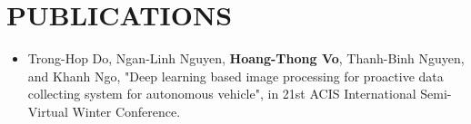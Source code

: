 \section{PUBLICATIONS}
\vspace{1mm}
\begin{itemize}[leftmargin=*]
    \item Trong-Hop Do, Ngan-Linh Nguyen, \textbf{Hoang-Thong Vo}, Thanh-Binh Nguyen, and Khanh Ngo, "Deep learning based image processing for proactive data collecting system for autonomous vehicle", in 21st ACIS International Semi-Virtual Winter Conference.
\end{itemize}